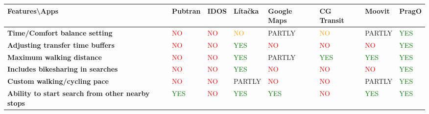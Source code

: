 \overfullrule=0pt
\begin{table}[H]
\centering
\scriptsize %
\begin{tabularx}{\textwidth}{ | >{\scriptsize\centering\arraybackslash}m{3.6cm} | >{\tiny\centering\arraybackslash}m{0.8cm} | >{\tiny\centering\arraybackslash}m{0.8cm} | >{\tiny\centering\arraybackslash}X | >{\tiny\centering\arraybackslash}X | >{\tiny\centering\arraybackslash}m{0.8cm} | >{\tiny\centering\arraybackslash}X | >{\tiny\centering\arraybackslash}m{0.8cm} | }
\hline
\textbf{Features\textbackslash Apps} & \textbf{Pubtran} & \textbf{IDOS} & \textbf{Lítačka} & \textbf{Google Maps} & \textbf{CG Transit} & \textbf{Moovit} & \textbf{PragO} \\ \hline
\textbf{Time/Comfort balance setting} & \textcolor{red}{NO}\footnotemark[1] & \textcolor{red}{NO}\footnotemark[1] & \textcolor{orange}{NO}\footnotemark[2] & \textcolor{darkyellow}{PARTLY}\footnotemark[3] & \textcolor{orange}{NO}\footnotemark[2] & \textcolor{darkyellow}{PARTLY}\footnotemark[3] & \textcolor{green}{YES} \\ \hline
\textbf{Adjusting transfer time buffers} & \textcolor{red}{NO} & \textcolor{red}{NO} & \textcolor{green}{YES} & \textcolor{red}{NO} & \textcolor{red}{NO} & \textcolor{red}{NO} & \textcolor{green}{YES} \\ \hline
\textbf{Maximum walking distance} & \textcolor{red}{NO} & \textcolor{red}{NO} & \textcolor{green}{YES}\footnotemark[5] & \textcolor{darkyellow}{PARTLY}\footnotemark[8] & \textcolor{green}{YES}\footnotemark[7] & \textcolor{green}{YES}\footnotemark[7] & \textcolor{green}{YES} \\ \hline
\textbf{Includes bikesharing in searches} & \textcolor{red}{NO} & \textcolor{red}{NO} & \textcolor{green}{YES}\footnotemark[4]\footnotemark[5] & \textcolor{red}{NO} & \textcolor{red}{NO} & \textcolor{red}{NO} & \textcolor{green}{YES} \\ \hline
\textbf{Custom walking/cycling pace} & \textcolor{red}{NO} & \textcolor{red}{NO} & \textcolor{darkyellow}{PARTLY}\footnotemark[6] & \textcolor{red}{NO} & \textcolor{red}{NO} & \textcolor{darkyellow}{PARTLY}\footnotemark[6] & \textcolor{green}{YES} \\ \hline
\textbf{Ability to start search from other nearby stops} & \textcolor{green}{YES} & \textcolor{red}{NO} & \textcolor{green}{YES}\footnotemark[4]\footnotemark[5] & \textcolor{green}{YES} & \textcolor{red}{NO} & \textcolor{green}{YES} & \textcolor{green}{YES} \\ \hline

\end{tabularx}
\end{table}
